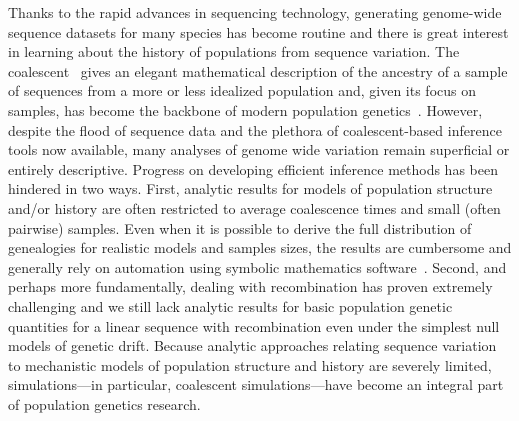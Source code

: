 \documentclass[graybox]{svmult}
\begin{document}
Thanks to the rapid advances in sequencing technology, generating
genome-wide sequence datasets for many species has become routine and
there is great interest in learning about the history of
populations from sequence variation. The
coalescent~\citep{hudson1983testing,kingman1982coalescent,Tajima1983Evolutionary}
gives an
elegant mathematical description of the ancestry of a sample of
sequences from a more or less idealized population and, given its focus
on samples, has become the backbone of modern population
genetics~\citep{hudson1990gene,wakely2008coalescent}.
However, despite the flood of sequence data and the plethora of
coalescent-based inference tools now available, many analyses of genome
wide variation remain superficial or entirely descriptive. Progress on
developing efficient inference methods has been hindered in two ways.
First, analytic results for models of population structure and/or history are
often restricted to average coalescence times and small (often pairwise)
samples. Even when it is possible to derive the full distribution of
genealogies for realistic models and samples sizes, the results are
cumbersome and generally rely on automation using symbolic mathematics software~\citep{Lohse2016}. Second, and
perhaps more fundamentally, dealing with recombination has proven
extremely challenging and we still lack analytic results for basic population genetic quantities for a linear sequence with recombination even under the simplest null models of
genetic drift.
Because analytic approaches relating sequence variation to mechanistic models
of population structure and history are severely limited, simulations---in particular, coalescent
simulations---have become an integral part of population genetics research.

\end{document}
